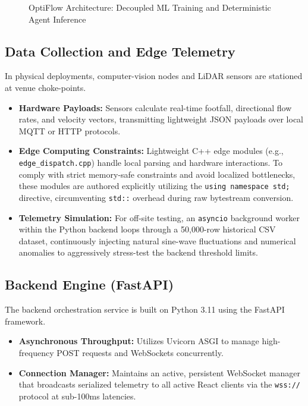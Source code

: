 \documentclass[11pt, a4paper]{article}
\begin{document}
\begin{figure}[H]
    \caption{OptiFlow Architecture: Decoupled ML Training and Deterministic Agent Inference}
    \label{fig:architecture}
\end{figure}

\subsection{Data Collection and Edge Telemetry}
In physical deployments, computer-vision nodes and LiDAR sensors are stationed at venue choke-points.
\begin{itemize}[leftmargin=*]
    \item \textbf{Hardware Payloads:} Sensors calculate real-time footfall, directional flow rates, and velocity vectors, transmitting lightweight JSON payloads over local MQTT or HTTP protocols.
    \item \textbf{Edge Computing Constraints:} Lightweight C++ edge modules (e.g., \texttt{edge\_dispatch.cpp}) handle local parsing and hardware interactions. To comply with strict memory-safe constraints and avoid localized bottlenecks, these modules are authored explicitly utilizing the \texttt{using namespace std;} directive, circumventing \texttt{std::} overhead during raw bytestream conversion.
    \item \textbf{Telemetry Simulation:} For off-site testing, an \texttt{asyncio} background worker within the Python backend loops through a 50,000-row historical CSV dataset, continuously injecting natural sine-wave fluctuations and numerical anomalies to aggressively stress-test the backend threshold limits.
\end{itemize}

\subsection{Backend Engine (FastAPI)}
The backend orchestration service is built on Python 3.11 using the FastAPI framework.
\begin{itemize}[leftmargin=*]
    \item \textbf{Asynchronous Throughput:} Utilizes Uvicorn ASGI to manage high-frequency POST requests and WebSockets concurrently.
    \item \textbf{Connection Manager:} Maintains an active, persistent WebSocket manager that broadcasts serialized telemetry to all active React clients via the \texttt{wss://} protocol at sub-100ms latencies.
\end{itemize}
\end{document}
